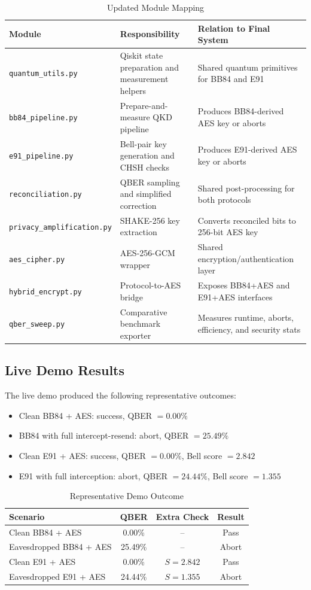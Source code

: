 \documentclass[conference]{IEEEtran}
\begin{document}
\begin{table}[htbp]
\caption{Updated Module Mapping}
\centering
\begin{tabular}{p{}p{}p{}}
\toprule
\textbf{Module} & \textbf{Responsibility} & \textbf{Relation to Final System} \\
\midrule
\texttt{quantum\_utils.py} & Qiskit state preparation and measurement helpers & Shared quantum primitives for BB84 and E91 \\
\texttt{bb84\_pipeline.py} & Prepare-and-measure QKD pipeline & Produces BB84-derived AES key or aborts \\
\texttt{e91\_pipeline.py} & Bell-pair key generation and CHSH checks & Produces E91-derived AES key or aborts \\
\texttt{reconciliation.py} & QBER sampling and simplified correction & Shared post-processing for both protocols \\
\texttt{privacy\_amplification.py} & SHAKE-256 key extraction & Converts reconciled bits to 256-bit AES key \\
\texttt{aes\_cipher.py} & AES-256-GCM wrapper & Shared encryption/authentication layer \\
\texttt{hybrid\_encrypt.py} & Protocol-to-AES bridge & Exposes BB84+AES and E91+AES interfaces \\
\texttt{qber\_sweep.py} & Comparative benchmark exporter & Measures runtime, aborts, efficiency, and security stats \\
\bottomrule
\end{tabular}
\label{tab:modules}
\end{table}

\subsection{Live Demo Results}
The live demo produced the following representative outcomes:
\begin{itemize}
\item Clean BB84 + AES: success, QBER $=0.00\%$
\item BB84 with full intercept-resend: abort, QBER $=25.49\%$
\item Clean E91 + AES: success, QBER $=0.00\%$, Bell score $=2.842$
\item E91 with full interception: abort, QBER $=24.44\%$, Bell score $=1.355$
\end{itemize}

\begin{table}[htbp]
\caption{Representative Demo Outcome}
\centering
\begin{tabular}{lccc}
\toprule
\textbf{Scenario} & \textbf{QBER} & \textbf{Extra Check} & \textbf{Result} \\
\midrule
Clean BB84 + AES & 0.00\% & -- & Pass \\
Eavesdropped BB84 + AES & 25.49\% & -- & Abort \\
Clean E91 + AES & 0.00\% & $S=2.842$ & Pass \\
Eavesdropped E91 + AES & 24.44\% & $S=1.355$ & Abort \\
\bottomrule
\end{tabular}
\label{tab:demo}
\end{table}
\end{document}
